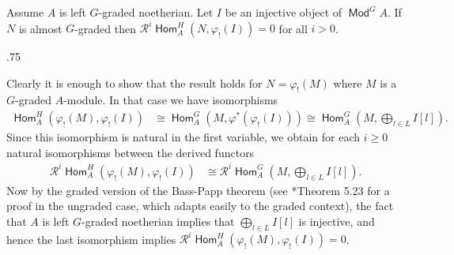 \documentclass[11pt,fleqn]{article}
\makeatletter
\renewenvironment{proof}[1][\textit{Proof}]{\par
  \pushQED{\qed}%
  \normalfont \topsep.75\paraskip\relax
  \trivlist
  \item[\hskip\labelsep
        \itshape
    #1\@addpunct{.}]\ignorespaces
}{%
  \popQED\endtrivlist\@endpefalse
}
\renewcommand\phi{\varphi}
\newcommand\R{\mathcal R}
\DeclareMathOperator\Mod{\mathsf{Mod}}
\DeclareMathOperator\Hom{\mathsf{Hom}}
\makeatother
\begin{document}
\label{L:acyclic}
\begin{Lemma*}
Assume $A$ is left $G$-graded noetherian. Let $I$ be an injective object of 
$\Mod^G A$. If $N$ is almost $G$-graded then $\R^i\Hom_A^H(N, \phi_!(I)) = 0$
for all $i > 0$.
\end{Lemma*}
\begin{proof}
Clearly it is enough to show that the result holds for $N = \phi_!(M)$ where
$M$ is a $G$-graded $A$-module. In that case we have isomorphisms
\begin{align*}
\Hom_A^H(\phi_!(M), \phi_!(I)) 
  &\cong \Hom_A^G(M, \phi^*(\phi_!(I)))
  \cong \Hom_A^G\left(M, \bigoplus_{l \in L} I[l] \right).
\end{align*}
Since this isomorphism is natural in the first variable, we obtain for each 
$i \geq 0$ natural isomorphisms between the derived functors
\begin{align*}
\R^i \Hom_A^H(\phi_!(M), \phi_!(I)) 
  &\cong\R^i\Hom_A^G\left(M, \bigoplus_{l \in L} I[l] \right).
\end{align*}
Now by the graded version of the Bass-Papp theorem (see 
\cite{GW-noetherian-book}*{Theorem 5.23} for a proof in 
the ungraded case, which adapts easily to the graded context), the fact that 
$A$ is left $G$-graded noetherian implies that $\bigoplus_{l \in L} I[l]$ is 
injective, and hence the last isomorphism implies $\R^i \Hom_A^H(\phi_!(M), 
\phi_!(I)) = 0$.
\end{proof}
\end{document}
